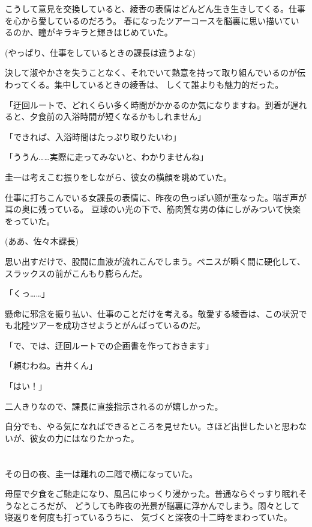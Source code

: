 ﻿\documentclass[
    book,tate,
    line_length=30zw,
    jafontsize=12pt,
    paper=b5j,
    landscape,
    ]{jlreq}
\begin{document}
こうして意見を交換していると、綾香の表情はどんどん生き生きしてくる。仕事を心から愛しているのだろう。
春になったツアーコースを脳裏に思い描いているのか、瞳がキラキラと輝きはじめていた。

(やっぱり、仕事をしているときの課長は違うよな)

決して淑やかさを失うことなく、それでいて熱意を持って取り組んでいるのが伝わってくる。集中しているときの綾香は、
しくて誰よりも魅力的だった。

「迂回ルートで、どれくらい多く時間がかかるのか気になりますね。到着が遅れると、夕食前の入浴時間が短くなるかもしれません」

「できれば、入浴時間はたっぷり取りたいわ」

「ううん……実際に走ってみないと、わかりませんね」

圭一は考えこむ振りをしながら、彼女の横顔を眺めていた。

仕事に打ちこんでいる女課長の表情に、昨夜の色っぽい顔が重なった。喘ぎ声が耳の奥に残っている。
豆球のい光の下で、筋肉質な男の体にしがみついて快楽をっていた。

(ああ、佐々木課長)

思い出すだけで、股間に血液が流れこんでしまう。ペニスが瞬く間に硬化して、スラックスの前がこんもり膨らんだ。

「くっ……」

懸命に邪念を振り払い、仕事のことだけを考える。敬愛する綾香は、この状況でも北陸ツアーを成功させようとがんばっているのだ。

「で、では、迂回ルートでの企画書を作っておきます」

「頼むわね。吉井くん」

「はい！」

二人きりなので、課長に直接指示されるのが嬉しかった。

自分でも、やる気になればできるところを見せたい。さほど出世したいと思わないが、彼女の力にはなりたかった。

\section*{}

その日の夜、圭一は離れの二階で横になっていた。

母屋で夕食をご馳走になり、風呂にゆっくり浸かった。普通ならぐっすり眠れそうなところだが、
どうしても昨夜の光景が脳裏に浮かんでしまう。悶々として寝返りを何度も打っているうちに、
気づくと深夜の十二時をまわっていた。
\end{document}
